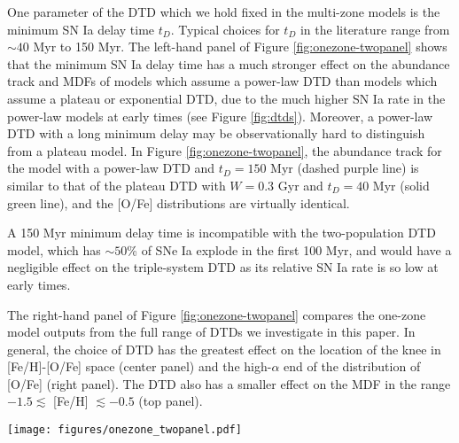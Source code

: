 \documentclass[modern,linenumbers]{aastex631}
\begin{document}
One parameter of the DTD which we hold fixed in the multi-zone models is the minimum SN Ia delay time $t_D$. Typical choices for $t_D$ in the literature range from $\sim 40$ Myr to 150 Myr. The left-hand panel of Figure \ref{fig:onezone-twopanel} shows that the minimum SN Ia delay time has a much stronger effect on the abundance track and MDFs of models which assume a power-law DTD than models which assume a plateau or exponential DTD, due to the much higher SN Ia rate in the power-law models at early times (see Figure \ref{fig:dtds}). Moreover, a power-law DTD with a long minimum delay may be observationally hard to distinguish from a plateau model. In Figure \ref{fig:onezone-twopanel}, the abundance track for the model with a power-law DTD and $t_D=150$ Myr (dashed purple line) is similar to that of the plateau DTD with $W=0.3$ Gyr and $t_D=40$ Myr (solid green line), and the [O/Fe] distributions are virtually identical. 

A 150 Myr minimum delay time is incompatible with the two-population DTD model, which has $\sim 50$\% of SNe Ia explode in the first 100 Myr, and would have a negligible effect on the triple-system DTD as its relative SN Ia rate is so low at early times. 

The right-hand panel of Figure \ref{fig:onezone-twopanel} compares the one-zone model outputs from the full range of DTDs we investigate in this paper. In general, the choice of DTD has the greatest effect on the location of the knee in [Fe/H]-[O/Fe] space (center panel) and the high-$\alpha$ end of the distribution of [O/Fe] (right panel). The DTD also has a smaller effect on the MDF in the range $-1.5\lesssim$ [Fe/H] $\lesssim-0.5$ (top panel).

\begin{figure*}
    \centering
    \texttt{[image: figures/onezone\_twopanel.pdf]}
    \caption{\textit{Left:} Comparison of one-zone models with minimum SN Ia delay times of 40 Myr (solid curves) and 150 Myr (dashed curves) for two DTDs: a power-law with $\alpha=-1.1$ (blue curves), and an exponential with $\tau=1.5$ Gyr (purple curves). The layout is similar to the plots in Figure \ref{fig:onezone-threepanel}. For clarity, we use a mass-loading factor $\eta=1$ for the exponential DTD run.
    \textit{Right:} Comparison of one-zone models which assume all five functional forms for the DTD in this paper: triple-system (green), plateau with $W=1$ Gyr (cyan), exponential with $\tau=1.5$ Gyr (purple), power-law with $\alpha=-1.1$ (blue), and two-population (pink). A minimum SN Ia delay time of 40 Myr is assumed for all models.}
    \label{fig:onezone-twopanel}
\end{figure*}
\end{document}

